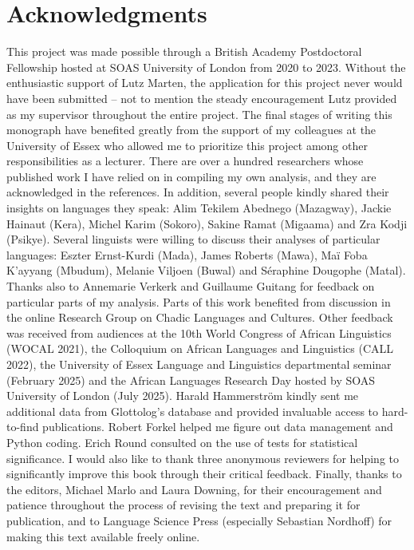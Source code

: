 \chapter*{Acknowledgments}

This project was made possible through a British Academy Postdoctoral Fellowship hosted at SOAS University of London from 2020 to 2023. Without the enthusiastic support of Lutz Marten, the application for this project never would have been submitted -- not to mention the steady encouragement Lutz provided as my supervisor throughout the entire project. The final stages of writing this monograph have benefited greatly from the support of my colleagues at the University of Essex who allowed me to prioritize this project among other responsibilities as a lecturer. There are over a hundred researchers whose published work I have relied on in compiling my own analysis, and they are acknowledged in the references. In addition, several people kindly shared their insights on languages they speak: Alim Tekilem Abednego (Mazagway), Jackie Hainaut (Kera), Michel Karim (Sokoro), Sakine Ramat (Migaama) and Zra Kodji (Psikye). Several linguists were willing to discuss their analyses of particular languages: Eszter Ernst-Kurdi (Mada), James Roberts (Mawa), Maï Foba K'ayyang (Mbudum), Melanie Viljoen (Buwal) and Séraphine Dougophe (Matal). Thanks also to Annemarie Verkerk and Guillaume Guitang for feedback on particular parts of my analysis. Parts of this work benefited from discussion in the online Research Group on Chadic Languages and Cultures. Other feedback was received from audiences at the 10th World Congress of African Linguistics (WOCAL 2021), the  Colloquium on African Languages and Linguistics (CALL 2022), the University of Essex Language and Linguistics departmental seminar (February 2025) and the African Languages Research Day hosted by SOAS University of London (July 2025). Harald Hammerström kindly sent me additional data from Glottolog's database and provided invaluable access to hard-to-find publications. Robert Forkel helped me figure out data management and Python coding. Erich Round consulted on the use of tests for statistical significance. I would also like to thank three anonymous reviewers for helping to significantly improve this book through their critical feedback. Finally, thanks to the editors, Michael Marlo and Laura Downing, for their encouragement and patience throughout the process of revising the text and preparing it for publication, and to Language Science Press (especially Sebastian Nordhoff) for making this text available freely online.